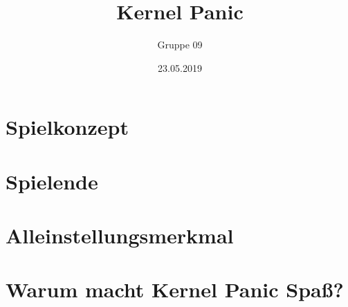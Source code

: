 \documentclass{beamer}
\title{Kernel Panic}
\author{Gruppe 09}
\date{23.05.2019}
\begin{document}
{
\frame{}
}

\section[Outline]{}
\frame{\tableofcontents}

\section{Spielkonzept}
\frame

\section{Spielende}
\frame

\section{Alleinstellungsmerkmal}
\frame

\section{Warum macht Kernel Panic Spaß?}
\frame
\end{document}
